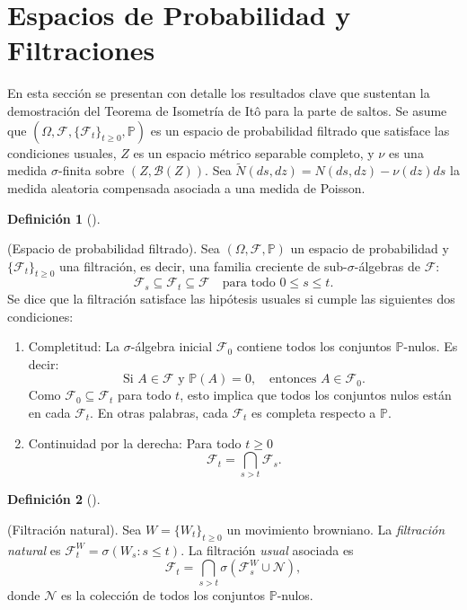 \documentclass[
  spanish,
  us-letterpaper,
]{scrreprt}
\providecommand{\tightlist}{%
  \setlength{\itemsep}{0pt}\setlength{\parskip}{0pt}}
\theoremstyle{plain}
\theoremstyle{plain}
\theoremstyle{definition}
\newtheorem{definition}{Definición}[chapter]
\theoremstyle{remark}
\begin{document}
\section{Espacios de Probabilidad y
Filtraciones}\label{espacios-de-probabilidad-y-filtraciones}

En esta sección se presentan con detalle los resultados clave que
sustentan la demostración del Teorema de Isometría de Itô para la parte
de saltos. Se asume que
\((\Omega, \mathcal{F}, \{\mathcal{F}_t\}_{t\geq0}, \mathbb{P})\) es un
espacio de probabilidad filtrado que satisface las condiciones usuales,
\(Z\) es un espacio métrico separable completo, y \(\nu\) es una medida
\(\sigma\)-finita sobre \((Z, \mathcal{B}(Z))\). Sea
\(\widetilde{N}(ds,dz) = N(ds,dz) - \nu(dz)ds\) la medida aleatoria
compensada asociada a una medida de Poisson.

\begin{definition}[]\protect\hypertarget{def-Espacio_probabilidad_filtrado}{}\label{def-Espacio_probabilidad_filtrado}

(Espacio de probabilidad filtrado). Sea
\((\Omega, \mathcal{F}, \mathbb{P})\) un espacio de probabilidad y
\(\{\mathcal{F}_t\}_{t \geq 0}\) una filtración, es decir, una familia
creciente de sub-\(\sigma\)-álgebras de \(\mathcal{F}\):
\[\mathcal{F}_s \subseteq \mathcal{F}_t \subseteq \mathcal{F} \quad \text{para todo } 0 \leq s \leq t.\]
Se dice que la filtración satisface las hipótesis usuales si cumple las
siguientes dos condiciones:

\begin{enumerate}
\def\labelenumi{\roman{enumi})}
\tightlist
\item
  Completitud: La \(\sigma\)-álgebra inicial \(\mathcal{F}_0\) contiene
  todos los conjuntos \(\mathbb{P}\)-nulos. Es decir:
  \[\text{Si } A \in \mathcal{F} \text{ y } \mathbb{P}(A) = 0, \quad \text{entonces } A \in \mathcal{F}_0.\]
  Como \(\mathcal{F}_0 \subseteq \mathcal{F}_t\) para todo \(t\), esto
  implica que todos los conjuntos nulos están en cada \(\mathcal{F}_t\).
  En otras palabras, cada \(\mathcal{F}_t\) es completa respecto a
  \(\mathbb{P}\).
\item
  Continuidad por la derecha: Para todo \(t \geq 0\)
  \[\mathcal{F}_t = \bigcap_{s > t} \mathcal{F}_s.\]
\end{enumerate}

\end{definition}

\begin{definition}[]\protect\hypertarget{def-filtracion_natural}{}\label{def-filtracion_natural}

(Filtración natural). Sea \(W = \{W_t\}_{t \geq 0}\) un movimiento
browniano. La \emph{filtración natural} es
\(\mathcal{F}_t^W = \sigma(W_s : s \leq t)\). La filtración \emph{usual}
asociada es
\[\mathcal{F}_t = \bigcap_{s > t} \sigma(\mathcal{F}_s^W \cup \mathcal{N}),\]
donde \(\mathcal{N}\) es la colección de todos los conjuntos
\(\mathbb{P}\)-nulos.

\end{definition}
\end{document}
